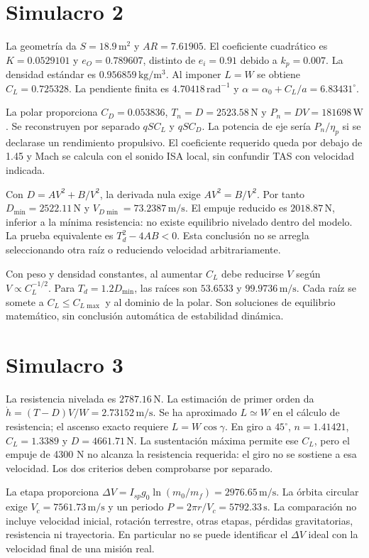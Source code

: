 
\section{Simulacro 2}
La geometría da $S=18.9\,\mathrm{m^2}$ y $AR=7.61905$. El coeficiente cuadrático es $K=0.0529101$ y $e_O=0.789607$, distinto de $e_i=0.91$ debido a $k_p=0.007$. La densidad estándar es $0.956859\,\mathrm{kg/m^3}$. Al imponer $L=W$ se obtiene $C_L=0.725328$. La pendiente finita es $4.70418\,\mathrm{rad^{-1}}$ y $\alpha=\alpha_0+C_L/a=6.83431^\circ$.

La polar proporciona $C_D=0.053836$, $T_n=D=2523.58\,\mathrm N$ y $P_n=DV=181698\,\mathrm W$. Se reconstruyen por separado $qS C_L$ y $qS C_D$. La potencia de eje sería $P_n/\eta_p$ si se declarase un rendimiento propulsivo. El coeficiente requerido queda por debajo de 1.45 y Mach se calcula con el sonido ISA local, sin confundir TAS con velocidad indicada.

Con $D=AV^2+B/V^2$, la derivada nula exige $AV^2=B/V^2$. Por tanto $D_{\min}=2522.11\,\mathrm N$ y $V_{D\min}=73.2387\,\mathrm{m/s}$. El empuje reducido es $2018.87\,\mathrm N$, inferior a la mínima resistencia: no existe equilibrio nivelado dentro del modelo. La prueba equivalente es $T_d^2-4AB<0$. Esta conclusión no se arregla seleccionando otra raíz o reduciendo velocidad arbitrariamente.

Con peso y densidad constantes, al aumentar $C_L$ debe reducirse $V$ según $V\propto C_L^{-1/2}$. Para $T_d=1.2D_{\min}$, las raíces son $53.6533$ y $99.9736\,\mathrm{m/s}$. Cada raíz se somete a $C_L\leq C_{L\max}$ y al dominio de la polar. Son soluciones de equilibrio matemático, sin conclusión automática de estabilidad dinámica.


\section{Simulacro 3}
La resistencia nivelada es $2787.16\,\mathrm N$. La estimación de primer orden da $\dot h=(T-D)V/W=2.73152\,\mathrm{m/s}$. Se ha aproximado $L\simeq W$ en el cálculo de resistencia; el ascenso exacto requiere $L=W\cos\gamma$. En giro a $45^\circ$, $n=1.41421$, $C_L=1.3389$ y $D=4661.71\,\mathrm N$. La sustentación máxima permite ese $C_L$, pero el empuje de 4300 N no alcanza la resistencia requerida: el giro no se sostiene a esa velocidad. Los dos criterios deben comprobarse por separado.

La etapa proporciona $\Delta V=I_{sp}g_0\ln(m_0/m_f)=2976.65\,\mathrm{m/s}$. La órbita circular exige $V_c=7561.73\,\mathrm{m/s}$ y un periodo $P=2\pi r/V_c=5792.33\,\mathrm s$. La comparación no incluye velocidad inicial, rotación terrestre, otras etapas, pérdidas gravitatorias, resistencia ni trayectoria. En particular no se puede identificar el $\Delta V$ ideal con la velocidad final de una misión real.

